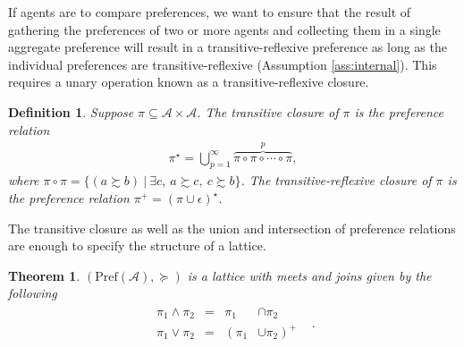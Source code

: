 \documentclass[conference]{ieeeconf}
\newcommand{\powerset}[1]{2^{#1}}
\newcommand{\A}{\mathcal{A}}
\newcommand{\X}{\mathcal{X}}
\newcommand{\Pref}{\mathrm{Pref}}
\newcommand{\prefers}{\succsim}
\newcommand{\join}{\vee}
\newcommand{\meet}{\wedge}
\DeclareMathOperator{\cl}{cl}
\DeclareMathOperator{\Cl}{Cl}
\newtheorem{theorem}{Theorem}
\newtheorem{definition}{Definition}
\begin{document}
If agents are to compare preferences, we want to ensure that the result of gathering the preferences of two or more agents and collecting them in a single aggregate preference will result in a transitive-reflexive preference as long as the individual preferences are transitive-reflexive (Assumption \ref{ass:internal}). This requires a unary operation known as a transitive-reflexive closure.
\begin{definition}
    Suppose $\pi \subseteq \A \times \A$. The \emph{transitive closure} of $\pi$ is the preference relation 
\begin{align}
    \pi^{\star} = \bigcup_{p=1}^{\infty} \overbrace{\pi \circ \pi \circ \cdots \circ \pi}^{p}, \label{eq:transitive-closure}
\end{align}
where $\pi \circ \pi = \{ (a \prefers b)~\vert~\exists c,~a \prefers c,~c \prefers b\}$. The \emph{transitive-reflexive closure} of $\pi$ is the preference relation $\pi^{+} = \left( \pi \cup \epsilon \right)^\star$.
\end{definition}


The transitive closure as well as the union and intersection of preference relations are enough to specify the structure of a lattice.

\begin{theorem}
    $(\Pref(\A), \succeq)$ is a lattice with meets and joins given by the following
    \leavevmode
    \begin{align}
    \begin{aligned}
        \pi_1 \meet \pi_2 &=& \pi_1 &\cap \pi_2& \\
 \pi_1 \join \pi_2 &=&  \left(\pi_1  \right. &\left. \cup \pi_2  \right)^{+}
    \end{aligned}. \label{eq:join-meets}
\end{align}
\end{theorem}
\end{document}
